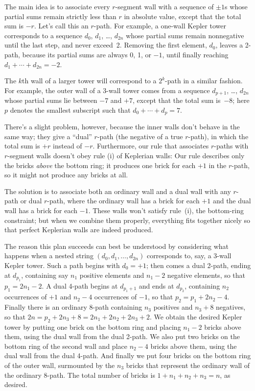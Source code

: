 The main idea is to associate every
$r$-segment wall with a sequence of $\pm1$s whose partial sums
remain strictly less than $r$ in absolute value, except that the total
sum is $-r$. Let's call this an $r$-path.
For example, a one-wall Kepler tower corresponds to
a sequence $d_0$, $d_1$, \dots, $d_{2n}$ whose partial sums
remain nonnegative until the last step, and never exceed~2. Removing
the first element, $d_0$, leaves a 2-path,
because its partial sums are always 0, 1,
or $-1$, until finally reaching $d_1+\cdots+d_{2n}=-2$.

The $k$th wall of a larger tower
will correspond to a $2^k$-path in a similar fashion.
For example, the outer wall of a 3-wall tower comes from a
sequence $d_{p+1}$, \dots, $d_{2n}$ whose partial sums lie between
$-7$ and $+7$, except that the total sum is~$-8$; here $p$ denotes
the smallest subscript such that $d_0+\cdots+d_p=7$.

There's a slight problem, however, because the inner walls don't behave
in the same way; they give a ``dual'' $r$-path (the negative of
a true $r$-path), in which the total sum is $+r$ instead of $-r$.
Furthermore, our rule that associates $r$-paths with $r$-segment
walls doesn't obey rule (i) of Keplerian walls: Our rule
describes only the bricks {\it above\/} the bottom ring;
it produces one brick for each $+1$ in the $r$-path, so it
might not produce any bricks at all.

The solution is to associate both an ordinary wall and a dual
wall with any $r$-path or dual $r$-path, where the
ordinary wall has a brick for each $+1$ and the dual wall
has a brick for each $-1$. These walls won't satisfy
rule~(i), the bottom-ring constraint; but when we combine
them properly, everything fits together nicely so that
perfect Keplerian walls are indeed produced.

The reason this plan succeeds can best be understood by considering
what happens when a nested string $(d_0,d_1,\ldots,d_{2n})$ corresponds to,
say, a 3-wall Kepler tower. Such a path begins with $d_0=+1$; then
comes a dual 2-path, ending at $d_{p_1}$,
containing say $n_1$ positive elements and $n_1-2$ negative elements,
so that $p_1=2n_1-2$. A dual 4-path begins at $d_{p_1+1}$ and ends at
$d_{p_2}$, containing $n_2$ occurrences of $+1$ and $n_2-4$
occurrences of $-1$, so that $p_2=p_1+2n_2-4$. Finally there is
an ordinary 8-path containing $n_3$ positives and $n_3+8$ negatives,
so that $2n=p_2+2n_3+8=2n_1+2n_2+2n_3+2$. We obtain the desired
Kepler tower by putting one brick on the bottom ring and placing
$n_1-2$ bricks above them, using the dual wall from the dual 2-path.
We also put two bricks on the bottom ring of the second wall
and place $n_2-4$ bricks above them, using the dual wall from
the dual 4-path. And finally we put four bricks on the bottom ring
of the outer wall, surmounted by the $n_3$ bricks that represent the
ordinary wall of the ordinary 8-path. The total number of bricks is
$1+n_1+n_2+n_3=n$, as desired.


